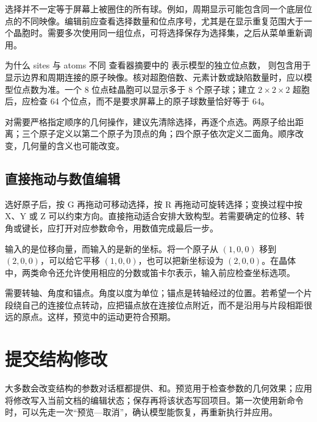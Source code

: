 选择并不一定等于屏幕上被圈住的所有球。例如，周期显示可能包含同一个底层位点的不同映像。编辑前应查看选择数量和位点序号，尤其是在显示重复范围大于一个晶胞时。需要多次使用同一组位点，可将选择保存为选择集，之后从菜单重新调用。

\begin{notebox}{为什么 sites 与 atoms 不同}
查看器摘要中的  表示模型的独立位点数， 则包含用于显示边界和周期连接的原子映像。核对超胞倍数、元素计数或缺陷数量时，应以模型位点数为准。一个 8 位点硅晶胞可以显示多于 8 个原子球；建立 $2\times2\times2$ 超胞后，应检查 64 个位点，而不是要求屏幕上的原子球数量恰好等于 64。
\end{notebox}



对需要严格指定顺序的几何操作，建议先清除选择，再逐个点选。两原子给出距离；三个原子定义以第二个原子为顶点的角；四个原子依次定义二面角。顺序改变，几何量的含义也可能改变。

\subsection{直接拖动与数值编辑}

选好原子后，按 G 再拖动可移动选择，按 R 再拖动可旋转选择；变换过程中按 X、Y 或 Z 可以约束方向。直接拖动适合安排大致构型。若需要确定的位移、转角或键长，应打开对应参数命令，用数值完成最后一步。

输入的是位移向量，而输入的是新的坐标。将一个原子从 $(1,0,0)$ 移到 $(2,0,0)$，可以给它平移 $(1,0,0)$，也可以把新坐标设为 $(2,0,0)$。在晶体中，两类命令还允许使用相应的分数或笛卡尔表示，输入前应检查坐标选项。

需要转轴、角度和锚点。角度以度为单位；锚点是转轴经过的位置。若希望一个片段绕自己的连接位点转动，应把锚点放在连接位点附近，而不是沿用与片段相距很远的原点。这样，预览中的运动更符合预期。


\section{提交结构修改}

大多数会改变结构的参数对话框都提供、和。预览用于检查参数的几何效果；应用将修改写入当前文档的编辑状态；保存再将该状态写回项目。第一次使用新命令时，可以先走一次“预览—取消”，确认模型能恢复，再重新执行并应用。


